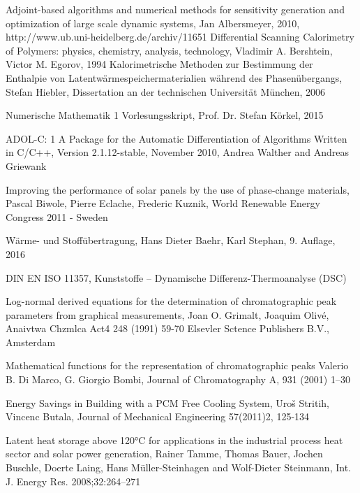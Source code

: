\documentclass{scrartcl}[12pt, halfparskip]
\numberwithin{equation}{section}
\numberwithin{figure}{section}
\numberwithin{table}{section}
\begin{document}
\begin{thebibliography}{9}

	 Adjoint-based algorithms and numerical methods for sensitivity generation and optimization of large scale dynamic systems, 
	 Jan Albersmeyer, 2010,
	 http://www.ub.uni-heidelberg.de/archiv/11651
	Differential Scanning Calorimetry of Polymers: physics, chemistry, analysis, technology,
	Vladimir A. Bershtein, Victor M. Egorov,
	1994
	Kalorimetrische Methoden zur Bestimmung
	der Enthalpie von Latentwärmespeichermaterialien
	während des Phasenübergangs,
	Stefan Hiebler, Dissertation an der technischen Universität München, 2006
	
	Numerische Mathematik 1 Vorlesungsskript, 
	Prof. Dr. Stefan Körkel, 2015

	ADOL-C: 1
	A Package for the Automatic Differentiation
	of Algorithms Written in C/C++,
	Version 2.1.12-stable, November 2010,
	Andrea Walther and Andreas Griewank
	
	Improving the performance of solar panels by the use of phase-change materials,
	Pascal Biwole, Pierre Eclache, Frederic Kuznik,
	World Renewable Energy Congress 2011 - Sweden
	
	Wärme- und Stoffübertragung,
	Hans Dieter Baehr, Karl Stephan,
	9. Auflage, 2016
	
	DIN EN ISO 11357, 
	Kunststoffe –
	Dynamische Differenz-Thermoanalyse (DSC)
	
	Log-normal derived equations for the determination
	of chromatographic peak parameters
	from graphical measurements,
	Joan O. Grimalt, Joaquim Olivé,
	Anaivtwa Chzmlca Act4 248 (1991) 59-70
	Elsevler Sctence Publishers B.V., Amsterdam
	
	Mathematical functions for the representation of chromatographic
	peaks
	Valerio B. Di Marco, G. Giorgio Bombi,
	Journal of Chromatography A, 931 (2001) 1–30
	
	Energy Savings in Building with a PCM Free Cooling System,
	Uroš Stritih, Vincenc Butala,
	Journal of Mechanical Engineering 57(2011)2, 125-134	
	
	Latent heat storage above 120°C for applications in the industrial process heat sector and solar power generation,
	Rainer Tamme, Thomas Bauer, Jochen Buschle, Doerte Laing, Hans Müller-Steinhagen and Wolf-Dieter Steinmann,
	Int. J. Energy Res. 2008;32:264–271
	

\end{thebibliography}
\end{document}

